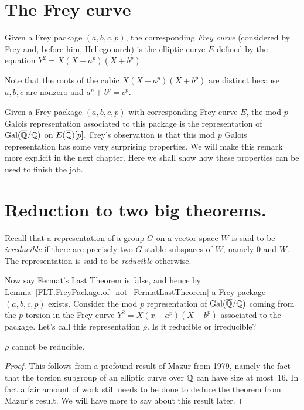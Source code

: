 \section{The Frey curve}

\begin{definition}[Frey]\label{FLT.FreyCurve}
  Given a Frey package $(a,b,c,p)$, the corresponding \emph{Frey curve} (considered by Frey and, before him, Hellegouarch) is the elliptic curve $E$ defined by the equation $Y^2=X(X-a^p)(X+b^p).$\end{definition}

Note that the roots of the cubic $X(X-a^p)(X+b^p)$ are distinct because $a,b,c$ are nonzero and $a^p+b^p=c^p$.

Given a Frey package $(a,b,c,p)$ with corresponding Frey curve $E$, the mod $p$ Galois representation associated to this package is the representation of $\operatorname{Gal}(\overline{\mathbb{Q}}/\mathbb{Q})$ on $E(\overline{\mathbb{Q}})[p].$ Frey's observation is that this mod $p$ Galois representation has some very surprising properties. We will make this remark more explicit in the next chapter. Here we shall show how these properties can be used to finish the job.

\section{Reduction to two big theorems.}
  
Recall that a representation of a group $G$ on a vector space $W$ is said to be \emph{irreducible} if there are precisely two $G$-stable subspaces of $W$, namely $0$ and $W$. The representation is said to be \emph{reducible} otherwise.

Now say Fermat's Last Theorem is false, and hence by Lemma~\ref{FLT.FreyPackage.of_not_FermatLastTheorem} a Frey package $(a,b,c,p)$ exists.  Consider the mod $p$ representation of $\operatorname{Gal}(\overline{\mathbb{Q}}/\mathbb{Q})$ coming from the $p$-torsion in the Frey curve $Y^2=X(x-a^p)(X+b^p)$ associated to the package. Let's call this representation $\rho$. Is it reducible or irreducible?

\begin{theorem}[Mazur]\label{FLT.Mazur_Frey}\leanok $\rho$ cannot be reducible.\end{theorem}
\begin{proof}\notready This follows from a profound result of Mazur \cite{mazur-torsion} from 1979, namely the fact that the torsion subgroup of an elliptic curve over $\mathbb{Q}$ can have size at most~16. In fact a fair amount of work still needs to be done to deduce the theorem from Mazur's result. We will have more to say about this result later.
\end{proof}


